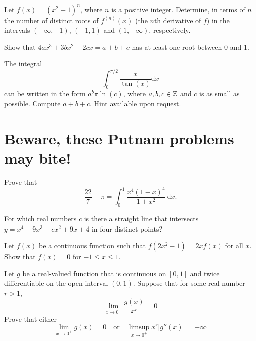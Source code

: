 \documentclass{article}
\begin{document}
\begin{exercise}
Let \(f(x)=(x^2-1)^n\), where \(n\) is a positive integer.
Determine, in terms of \(n\) the number of distinct roots of \(f^{(n)}(x)\) (the \(n\)th derivative of \(f\)) in the intervals \((-\infty,-1)\), \((-1,1)\) and \((1,+\infty)\), respectively.
\end{exercise}

\begin{exercise}
Show that $4ax^3 + 3bx^2 + 2cx = a + b + c$ has at least one root between 0 and 1.
\end{exercise}

\begin{exercise}
The integral
\[\int_0^{\pi/2}\frac{x}{\tan(x)}\mathrm{d}x\]
can be written in the form \(a^b\pi\ln(c)\), where \(a,b,c\in\mathbb{Z}\) and \(c\) is as small as possible.
Compute \(a+b+c\).
Hint available upon request.
\end{exercise}

\section{Beware, these Putnam problems may bite!}

\begin{exercise}[1968 A1]
    Prove that
    \[\frac{22}{7}-\pi = \int_0^1\frac{x^4(1-x)^4}{1+x^2}\ \mathrm{d}x.\]
\end{exercise}

\begin{exercise}[1994 B2]
    For which real numbers $c$ is there a straight line that intersects $y=x^4+9x^3+cx^2+9x+4$ in four distinct points?
\end{exercise}

\begin{exercise}[2000 B4]
    Let $f(x)$ be a continuous function such that $f(2x^{2} - 1) = 2xf(x)$ for all $x$. Show that $f(x) = 0$ for $-1 \leq x \leq 1$. 
\end{exercise}

\begin{exercise}[2019 A6]
Let $g$ be a real-valued function that is continuous on $[0,1]$ and twice differentiable on the open interval $(0,1)$. Suppose that for some real number $r>1$, 
\[\lim_{x\to 0^+} \frac{g(x)}{x^r}=0\] Prove that either 
\[\lim_{x\to 0^+} g(x)=0\quad\textrm{or}\quad\limsup_{x\to 0^+}x^r|g''(x)| = +\infty\]
\end{exercise}
\end{document}

